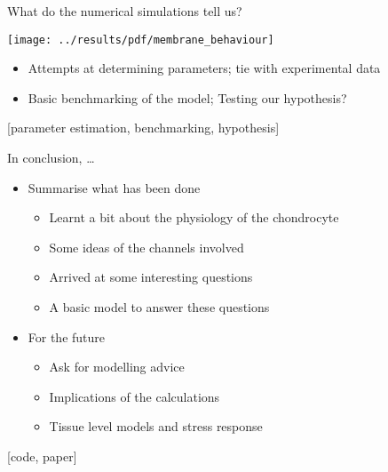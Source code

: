 \documentclass[ignorenonframetext]{beamer}
\newcommand{\references}[1] {
  \begin{flushright}
    \scriptsize [#1] \normalsize
  \end{flushright}
}
\begin{document}
%

\begin{frame}{What do the numerical simulations tell us?}

  \texttt{[image: ../results/pdf/membrane\_behaviour]}

  \begin{itemize}
  \item Attempts at determining parameters; tie with experimental data
  \item Basic benchmarking of the model; Testing our hypothesis?
  \end{itemize}

  \references{parameter estimation, benchmarking, hypothesis}

\end{frame}


\begin{frame}{In conclusion, \ldots}

  \begin{itemize}
  \item Summarise what has been done
    \begin{itemize}
      \item Learnt a bit about the physiology of the chondrocyte
      \item Some ideas of the channels involved
      \item Arrived at some interesting questions
      \item A basic model to answer these questions
    \end{itemize}
  \item For the future
    \begin{itemize}
    \item Ask for modelling advice
    \item Implications of the calculations
    \item Tissue level models and stress response
    \end{itemize}
  \end{itemize}

  \references{code, paper}

\end{frame}
\end{document}

